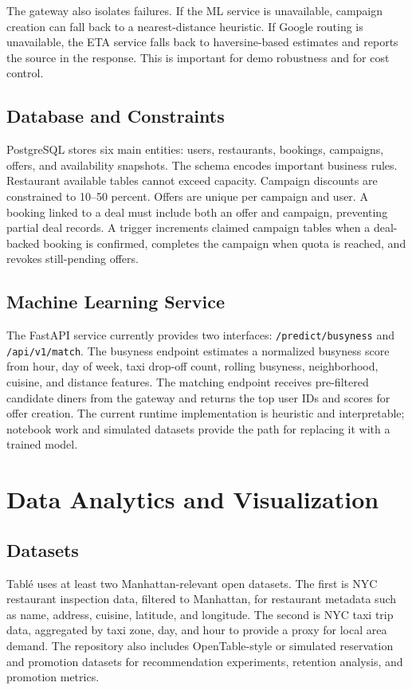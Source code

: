 \documentclass[conference]{IEEEtran}
\begin{document}
The gateway also isolates failures. If the ML service is unavailable, campaign creation can fall back to a nearest-distance heuristic. If Google routing is unavailable, the ETA service falls back to haversine-based estimates and reports the source in the response. This is important for demo robustness and for cost control.

\subsection{Database and Constraints}
PostgreSQL stores six main entities: users, restaurants, bookings, campaigns, offers, and availability snapshots. The schema encodes important business rules. Restaurant available tables cannot exceed capacity. Campaign discounts are constrained to 10--50 percent. Offers are unique per campaign and user. A booking linked to a deal must include both an offer and campaign, preventing partial deal records. A trigger increments claimed campaign tables when a deal-backed booking is confirmed, completes the campaign when quota is reached, and revokes still-pending offers.

\subsection{Machine Learning Service}
The FastAPI service currently provides two interfaces: \texttt{/predict/busyness} and \texttt{/api/v1/match}. The busyness endpoint estimates a normalized busyness score from hour, day of week, taxi drop-off count, rolling busyness, neighborhood, cuisine, and distance features. The matching endpoint receives pre-filtered candidate diners from the gateway and returns the top user IDs and scores for offer creation. The current runtime implementation is heuristic and interpretable; notebook work and simulated datasets provide the path for replacing it with a trained model.

\section{Data Analytics and Visualization}
\subsection{Datasets}
Tabl\'e uses at least two Manhattan-relevant open datasets. The first is NYC restaurant inspection data, filtered to Manhattan, for restaurant metadata such as name, address, cuisine, latitude, and longitude. The second is NYC taxi trip data, aggregated by taxi zone, day, and hour to provide a proxy for local area demand. The repository also includes OpenTable-style or simulated reservation and promotion datasets for recommendation experiments, retention analysis, and promotion metrics.
\end{document}

